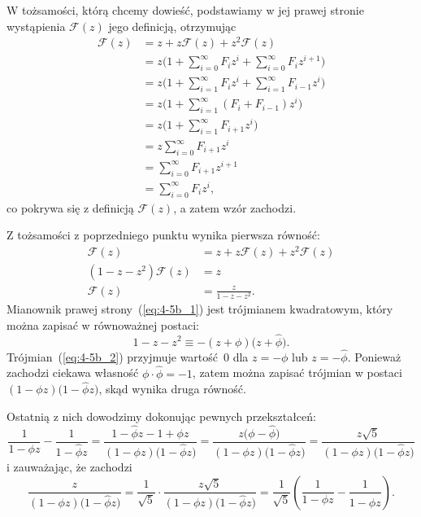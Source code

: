 
\subexercise{} %
W tożsamości, którą chcemy dowieść, podstawiamy w jej prawej stronie wystąpienia $\mathcal{F}(z)$ jego definicją, otrzymując
\begin{align*}
	\mathcal{F}(z) &= z+z\mathcal{F}(z)+z^2\mathcal{F}(z) \\
	&= z\biggl(1+\sum_{i=0}^\infty F_iz^i+\sum_{i=0}^\infty F_iz^{i+1}\biggr) \\
	&= z\biggl(1+\sum_{i=1}^\infty F_iz^i+\sum_{i=1}^\infty F_{i-1}z^i\biggr) \\
	&= z\biggl(1+\sum_{i=1}^\infty (F_i+F_{i-1})z^i\biggr) \\
	&= z\biggl(1+\sum_{i=1}^\infty F_{i+1}z^i\biggr) \\
	&= z\sum_{i=0}^\infty F_{i+1}z^i \\
	&= \sum_{i=0}^\infty F_{i+1}z^{i+1} \\
	&= \sum_{i=0}^\infty F_iz^i,
\end{align*}
co pokrywa się z definicją $\mathcal{F}(z)$, a zatem wzór zachodzi.

\subexercise{} %
Z tożsamości z poprzedniego punktu wynika pierwsza równość:
\begin{align}
	\mathcal{F}(z) &= z+z\mathcal{F}(z)+z^2\mathcal{F}(z) \nonumber \\
	(1-z-z^2)\mathcal{F}(z) &= z \nonumber \\
	\mathcal{F}(z) &= \frac{z}{1-z-z^2}. \label{eq:4-5b_1}
\end{align}
Mianownik prawej strony~(\ref{eq:4-5b_1}) jest trójmianem kwadratowym, który można zapisać w równoważnej postaci:
\begin{equation}
	1-z-z^2 \equiv -(z+\phi)\bigl(z+\widehat\phi\bigr). \label{eq:4-5b_2}
\end{equation}
Trójmian~(\ref{eq:4-5b_2}) przyjmuje wartość~0 dla $z=-\phi$ lub $z=-\widehat\phi$. Ponieważ zachodzi ciekawa własność $\phi\cdot\widehat\phi=-1$, zatem można zapisać trójmian w postaci $(1-\phi z)\bigl(1-\widehat\phi z\bigr)$, skąd wynika druga równość.

Ostatnią z nich dowodzimy dokonując pewnych przekształceń:
\[
	\frac{1}{1-\phi z}-\frac{1}{1-\widehat\phi z} = \frac{1-\widehat\phi z-1+\phi z}{(1-\phi z)\bigl(1-\widehat\phi z\bigr)} = \frac{z\bigl(\phi-\widehat\phi\bigr)}{(1-\phi z)\bigl(1-\widehat\phi z\bigr)} = \frac{z\sqrt{5}}{(1-\phi z)\bigl(1-\widehat\phi z\bigr)}
\]
i zauważając, że zachodzi
\[
	\frac{z}{(1-\phi z)\bigl(1-\widehat\phi z\bigr)} = \frac{1}{\sqrt{5}}\cdot\frac{z\sqrt{5}}{(1-\phi z)\bigl(1-\widehat\phi z\bigr)} = \frac{1}{\sqrt{5}}\left(\frac{1}{1-\phi z}-\frac{1}{1-\widehat\phi z}\right).
\]

